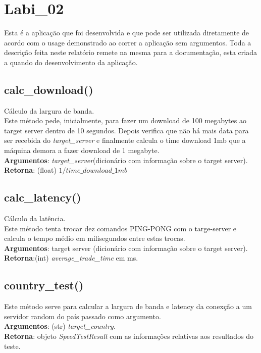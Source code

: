 \documentclass{report}
\begin{document}
\section{Labi\_02}
\hspace{5mm}Esta é a aplicação que foi desenvolvida e que pode ser utilizada diretamente de acordo com o usage demonstrado ao correr a aplicação sem argumentos. Toda a descrição feita neste relatório remete na mesma para a documentação, esta criada a quando do desenvolvimento da aplicação.

\subsection{calc\_download()}
\hspace{5mm}Cálculo da largura de banda.\\
Este método pede, inicialmente, para fazer um download de 100 megabytes ao target server dentro de 10 segundos. Depois verifica que não há mais data para ser recebida do \textit{target\_server} e finalmente calcula o time download 1mb que a máquina demora a fazer download de 1 megabyte.\\ 
\hspace{5mm}\textbf{Argumentos}: \textit{target\_server}(dicionário com informação sobre o target server). 
\hspace{5mm}\textbf{Retorna}: (float) $1/\textit{time\_download\_1mb}$

\subsection{calc\_latency()}
\hspace{5mm}Cálculo da latência.\\ 
Este método tenta trocar dez comandos PING-PONG com o targe-server e calcula o tempo médio em milisegundos entre estas trocas.\\
\hspace{5mm}\textbf{Argumentos}: target server (dicionário com informação sobre o target server). 
\hspace{5mm}\textbf{Retorna}:(int) \textit{average\_trade\_time} em ms.

\subsection{country\_test()}
\label{subsec.countrytest}
\hspace{5mm}Este método serve para calcular a largura de banda e latency da conexção a um servidor random do país passado como argumento.\\ 
\hspace{5mm}\textbf{Argumentos}: (str) \textit{target\_country}.\\
\textbf{Retorna}: objeto \textit{SpeedTestResult} com as informações relativas aos resultados do teste.
\end{document}
